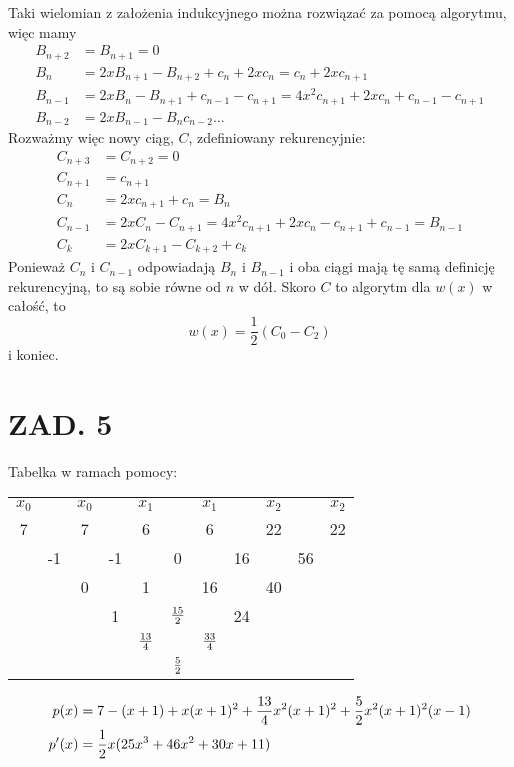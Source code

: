 \documentclass{article}[16pt]
\begin{document}
Taki wielomian z założenia indukcyjnego można rozwiązać za pomocą algorytmu, więc mamy
\begin{align*}
    B_{n+2}&=B_{n+1}=0\\
    B_n&=2xB_{n+1}-B_{n+2}+c_n+2xc_n=c_n+2xc_{n+1}\\
    B_{n-1}&=2xB_n-B_{n+1}+c_{n-1}-c_{n+1}=4x^2c_{n+1}+2xc_n+c_{n-1}-c_{n+1}\\
    B_{n-2}&=2xB_{n-1}-B_nc_{n-2}...
\end{align*}
Rozważmy więc nowy ciąg, $C$, zdefiniowany rekurencyjnie:
\begin{align*}
    C_{n+3}&=C_{n+2}=0\\
    C_{n+1}&=c_{n+1}\\
    C_n&=2xc_{n+1}+c_n=B_n\\
    C_{n-1}&=2xC_n-C_{n+1}=4x^2c_{n+1}+2xc_n-c_{n+1}+c_{n-1}=B_{n-1}\\
    C_k&=2xC_{k+1}-C_{k+2}+c_k
\end{align*}
Ponieważ $C_n$ i $C_{n-1}$ odpowiadają $B_n$ i $B_{n-1}$ i oba ciągi mają tę samą definicję rekurencyjną, to są sobie równe od $n$ w dół. Skoro $C$ to algorytm dla $w(x)$ w całość, to
$$w(x)=\frac12(C_0-C_2)$$
i koniec.

\section*{ZAD. 5}

Tabelka w ramach pomocy:

\begin{center}
    \begin{tabular}{ c c c c c c c c c c c }
        $x_0$ & & $x_0$ & & $x_1$ & & $x_1$ & & $x_2$ & & $x_2$\\
        7     & &  7    & &  6    & &  6    & &  22   & &  22\\
        &   -1    &  & -1   & &   0    & &  16   & &    56\\
        &    &     0    & &  1   & &    16   & &    40\\
        &    &     &    1   & &   ${15\over2}$ && 24\\
        & & & & ${13\over4}$ && ${33\over4}$\\
        & & & & & ${5\over2}$
    \end{tabular}
\end{center}

\begin{align*}
    p(x)&=7-(x+1)+x(x+1)^2+{13\over4}x^2(x+1)^2+{5\over2}x^2(x+1)^2(x-1)\\
    p'(x)&=\frac12x(25x^3+46x^2+30x+11)
\end{align*}
\end{document}
